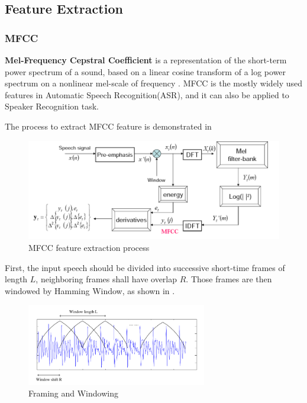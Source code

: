 

\subsection{Feature Extraction}

\subsubsection{MFCC}
\label{sec:mfcc}
\textbf{Mel-Frequency Cepstral Coefficient} is a representation of the short-term power spectrum of a sound,
based on a linear cosine transform of a log power spectrum on a nonlinear mel-scale of frequency \cite{mfcc} .
MFCC is the mostly widely used features in Automatic Speech Recognition(ASR), and it can also be applied to Speaker Recognition task.


The process to extract MFCC feature is demonstrated in 
\begin{figure}

  \centering
  \includegraphics[width=\textwidth]{img/MFCC.png}
  \caption{MFCC feature extraction process\label{fig:mfcc}}

\end{figure}

First, the input speech should be divided into successive short-time frames of length $L$,
neighboring frames shall have overlap $R$.
Those frames are then windowed by Hamming Window, as shown in .
\begin{figure}
  \centering
  \includegraphics[width=0.7\textwidth]{img/MFCC-windowing-frames.png}
  \caption{Framing and Windowing \label{fig:framming}}
\end{figure}

